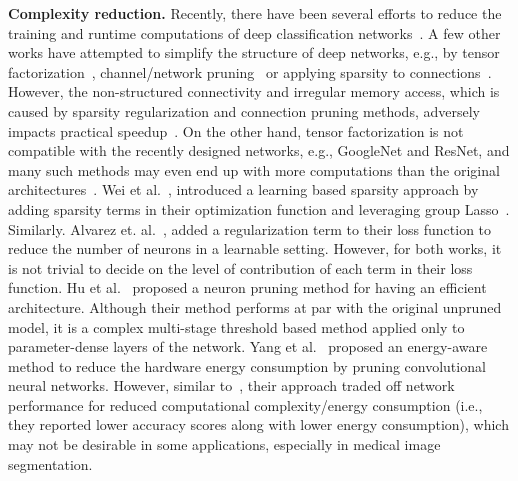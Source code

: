 \documentclass{article}
\begin{document}
\textbf{Complexity reduction.} Recently, there have been several efforts to reduce the training and runtime computations of deep classification networks~\cite{leroux2018iamnn,howard2017mobilenets, zhang2017shufflenet, iandola2016squeezenet}. A few other works have attempted to simplify the structure of deep networks, e.g., by tensor factorization~\cite{jaderberg2014speeding,kim2015compression,lebedev2014speeding}, channel/network pruning~\cite{wen2016learning,hu2016network} or applying sparsity to connections~\cite{han2015learning,han2015deep,liu2015sparse,guo2016dynamic,han2016eie}. However, the non-structured connectivity and irregular memory access, which is caused by sparsity regularization and connection pruning methods, adversely impacts practical speedup~\cite{wen2016learning}. On the other hand, tensor factorization is not compatible with the recently designed networks, e.g., GoogleNet and ResNet, and many such methods may even end up with more computations than the original architectures~\cite{he2017channel}. Wei et al.~\cite{wen2016learning}, introduced a learning based sparsity approach by adding sparsity terms in their optimization function and leveraging group Lasso~\cite{yuan2006model}. Similarly. Alvarez et. al.~\cite{alvarez2016learning}, added a regularization term to their loss function to reduce the number of neurons in a learnable setting. However, for both works, it is not trivial to decide on the level of contribution of each term in their loss function. Hu et al.~\cite{hu2016network} proposed a neuron pruning method for having an efficient architecture. Although their method performs at par with the original unpruned model, it is a complex multi-stage threshold based method applied only to parameter-dense layers of the network. Yang et al.~\cite{yang2017designing} proposed an energy-aware method to reduce the hardware energy consumption by pruning convolutional neural networks. However, similar to~\cite{liu2015sparse,denton2014exploiting,jaderberg2014speeding,he2017channel}, their approach traded off network performance  for reduced computational complexity/energy consumption (i.e., they reported lower accuracy scores along with   lower energy consumption), which may not be desirable in some applications, especially in medical image segmentation.
\end{document}
